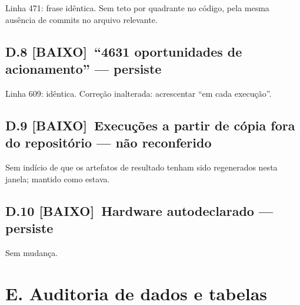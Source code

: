 \documentclass[11pt,a4paper]{article}
\newcommand{\baixo}{\textbf{\color{gray}[BAIXO]}}
\begin{document}
Linha 471: frase idêntica. Sem teto por quadrante no código, pela mesma ausência de commits no arquivo
relevante.

\subsection*{D.8 \baixo\ ``4631 oportunidades de acionamento'' --- persiste}

Linha 609: idêntica. Correção inalterada: acrescentar ``em cada execução''.

\subsection*{D.9 \baixo\ Execuções a partir de cópia fora do repositório --- não reconferido}

Sem indício de que os artefatos de resultado tenham sido regenerados nesta janela; mantido como estava.

\subsection*{D.10 \baixo\ Hardware autodeclarado --- persiste}

Sem mudança.

\section*{E. Auditoria de dados e tabelas}
\end{document}
